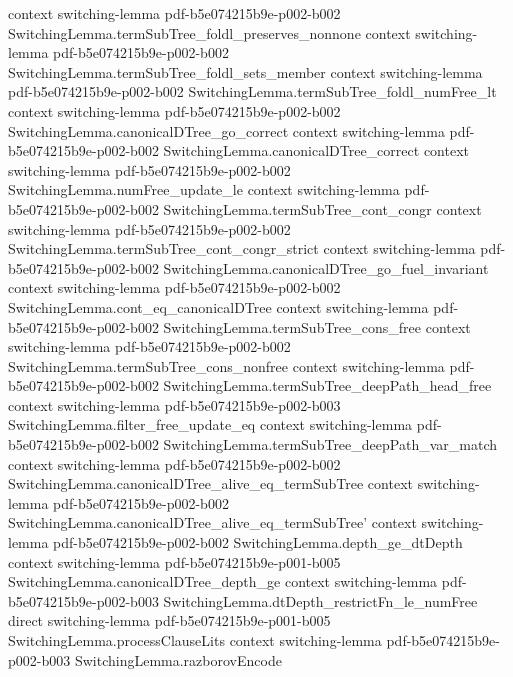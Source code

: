 \begin{lemma}
  {context}
  {switching-lemma}
  {pdf-b5e074215b9e-p002-b002}
\proofstep
  {SwitchingLemma.termSubTree_foldl_preserves_nonnone}
  {context}
  {switching-lemma}
  {pdf-b5e074215b9e-p002-b002}
\proofstep
  {SwitchingLemma.termSubTree_foldl_sets_member}
  {context}
  {switching-lemma}
  {pdf-b5e074215b9e-p002-b002}
\proofstep
  {SwitchingLemma.termSubTree_foldl_numFree_lt}
  {context}
  {switching-lemma}
  {pdf-b5e074215b9e-p002-b002}
\proofstep
  {SwitchingLemma.canonicalDTree_go_correct}
  {context}
  {switching-lemma}
  {pdf-b5e074215b9e-p002-b002}
\proofstep
  {SwitchingLemma.canonicalDTree_correct}
  {context}
  {switching-lemma}
  {pdf-b5e074215b9e-p002-b002}
\proofstep
  {SwitchingLemma.numFree_update_le}
  {context}
  {switching-lemma}
  {pdf-b5e074215b9e-p002-b002}
\proofstep
  {SwitchingLemma.termSubTree_cont_congr}
  {context}
  {switching-lemma}
  {pdf-b5e074215b9e-p002-b002}
\proofstep
  {SwitchingLemma.termSubTree_cont_congr_strict}
  {context}
  {switching-lemma}
  {pdf-b5e074215b9e-p002-b002}
\proofstep
  {SwitchingLemma.canonicalDTree_go_fuel_invariant}
  {context}
  {switching-lemma}
  {pdf-b5e074215b9e-p002-b002}
\proofstep
  {SwitchingLemma.cont_eq_canonicalDTree}
  {context}
  {switching-lemma}
  {pdf-b5e074215b9e-p002-b002}
\proofstep
  {SwitchingLemma.termSubTree_cons_free}
  {context}
  {switching-lemma}
  {pdf-b5e074215b9e-p002-b002}
\proofstep
  {SwitchingLemma.termSubTree_cons_nonfree}
  {context}
  {switching-lemma}
  {pdf-b5e074215b9e-p002-b002}
\proofstep
  {SwitchingLemma.termSubTree_deepPath_head_free}
  {context}
  {switching-lemma}
  {pdf-b5e074215b9e-p002-b003}
\proofstep
  {SwitchingLemma.filter_free_update_eq}
  {context}
  {switching-lemma}
  {pdf-b5e074215b9e-p002-b002}
\proofstep
  {SwitchingLemma.termSubTree_deepPath_var_match}
  {context}
  {switching-lemma}
  {pdf-b5e074215b9e-p002-b002}
\proofstep
  {SwitchingLemma.canonicalDTree_alive_eq_termSubTree}
  {context}
  {switching-lemma}
  {pdf-b5e074215b9e-p002-b002}
\proofstep
  {SwitchingLemma.canonicalDTree_alive_eq_termSubTree'}
  {context}
  {switching-lemma}
  {pdf-b5e074215b9e-p002-b002}
\proofstep
  {SwitchingLemma.depth_ge_dtDepth}
  {context}
  {switching-lemma}
  {pdf-b5e074215b9e-p001-b005}
\proofstep
  {SwitchingLemma.canonicalDTree_depth_ge}
  {context}
  {switching-lemma}
  {pdf-b5e074215b9e-p002-b003}
\proofstep
  {SwitchingLemma.dtDepth_restrictFn_le_numFree}
  {direct}
  {switching-lemma}
  {pdf-b5e074215b9e-p001-b005}
\proofstep
  {SwitchingLemma.processClauseLits}
  {context}
  {switching-lemma}
  {pdf-b5e074215b9e-p002-b003}
\proofstep
  {SwitchingLemma.razborovEncode}

\end{lemma}
